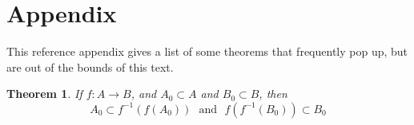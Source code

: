 \documentclass{article}
\newtheorem{theorem}{Theorem}[section]
\theoremstyle{remark}
\theoremstyle{definition}
\begin{document}
\hrulefill


\newpage

\section{Appendix}

This reference appendix gives a list of some theorems that frequently pop up, but are out of the bounds of this text.

\begin{theorem}
If $f : A \to B$, and $A_0 \subset A$ and $B_0 \subset B$, then $$A_0 \subset f^{-1}(f(A_0)) \ \ \  \text{and} \ \ \ f(f^{-1}(B_0)) \subset B_0$$
\end{theorem}
\end{document}
